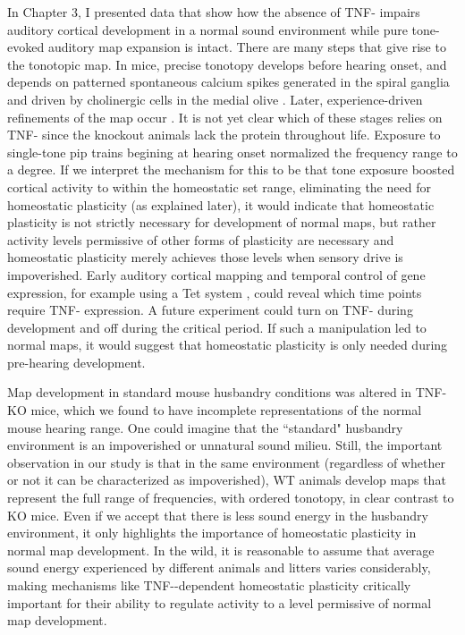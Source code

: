 In Chapter 3, I presented data that show how the absence of TNF-\textalpha{} impairs auditory cortical development in a normal sound environment while pure tone-evoked auditory map expansion is intact. There are many steps that give rise to the tonotopic map. In mice, precise tonotopy develops before hearing onset, and depends on patterned spontaneous calcium spikes generated in the spiral ganglia and driven by cholinergic cells in the medial olive \cite{Elgoyhen1994, Cao2008, Clause2014}. Later, experience-driven refinements of the map occur \cite{DeVillers-Sidani2008, Han2007}. It is not yet clear which of these stages relies on TNF-\textalpha{} since the knockout animals lack the protein throughout life. Exposure to single-tone pip trains begining at hearing onset normalized the frequency range to a degree. If we interpret the mechanism for this to be that tone exposure boosted cortical activity to within the homeostatic set range, eliminating the need for homeostatic plasticity (as explained later), it would indicate that homeostatic plasticity is not strictly necessary for development of normal maps, but rather activity levels permissive of other forms of plasticity are necessary and homeostatic plasticity merely achieves those levels when sensory drive is impoverished. Early auditory cortical mapping and temporal control of gene expression, for example using a Tet system \cite{Gossen1995}, could reveal which time points require TNF-\textalpha{} expression. A future experiment could turn on TNF-\textalpha{} during development and off during the critical period. If such a manipulation led to normal maps, it would suggest that homeostatic plasticity is only needed during pre-hearing development.

Map development in standard mouse husbandry conditions was altered in TNF-\textalpha{} KO mice, which we found to have incomplete representations of the normal mouse hearing range. One could imagine that the ``standard" husbandry environment is an impoverished or unnatural sound milieu. Still, the important observation in our study is that in the same environment (regardless of whether or not it can be characterized as impoverished), WT animals develop maps that represent the full range of frequencies, with ordered tonotopy, in clear contrast to KO mice. Even if we accept that there is less sound energy in the husbandry environment, it only highlights the importance of homeostatic plasticity in normal map development. In the wild, it is reasonable to assume that average sound energy experienced by different animals and litters varies considerably, making mechanisms like TNF-\textalpha{}-dependent homeostatic plasticity critically important for their ability to regulate activity to a level permissive of normal map development.

